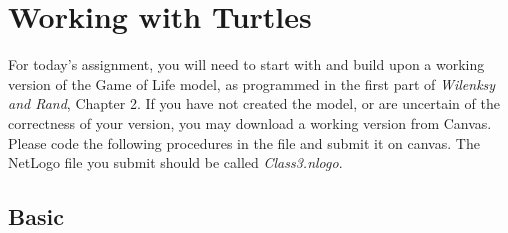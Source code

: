 \documentclass[11pt]{book}
\begin{document}
\chapter{Working with Turtles}

For today's assignment, you will need to start with and build upon a working version of the Game of Life model, as programmed in the first part of {\it Wilenksy and Rand}, Chapter 2. If you have not created the model, or are uncertain of the correctness of your version, you may download a working version from Canvas. Please code the following procedures in the file and submit it on canvas. The NetLogo file you submit should be called {\it Class3.nlogo}.

\section{Basic}
\end{document}
